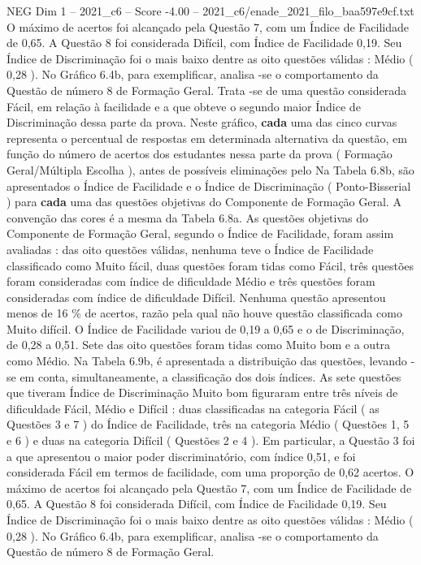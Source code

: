 \begin{textsample}{NEG Dim 1 – 2021\_c6 – Score -4.00 – 2021\_c6/enade\_2021\_filo\_baa597e9cf.txt}
O máximo de acertos foi alcançado pela Questão 7, com um Índice de Facilidade de 0,65.
A Questão 8 foi considerada Difícil, com Índice de Facilidade 0,19.
Seu Índice de Discriminação foi o mais baixo dentre as oito questões válidas : Médio ( 0,28 ).
No Gráfico 6.4b, para exemplificar, analisa -se o comportamento da Questão de número 8 de Formação Geral.
Trata -se de uma questão considerada Fácil, em relação à facilidade e a que obteve o segundo maior Índice de Discriminação dessa parte da prova.
Neste gráfico, \textbf{cada} uma das cinco curvas representa o percentual de respostas em determinada alternativa da questão, em função do número de acertos dos estudantes nessa parte da prova ( Formação Geral/Múltipla Escolha ), antes de possíveis eliminações pelo Na Tabela 6.8b, são apresentados o Índice de Facilidade e o Índice de Discriminação ( Ponto-Bisserial ) para \textbf{cada} uma das questões objetivas do Componente de Formação Geral.
A convenção das cores é a mesma da Tabela 6.8a.
As questões objetivas do Componente de Formação Geral, segundo o Índice de Facilidade, foram assim avaliadas : das oito questões válidas, nenhuma teve o Índice de Facilidade classificado como Muito fácil, duas questões foram tidas como Fácil, três questões foram consideradas com índice de dificuldade Médio e três questões foram consideradas com índice de dificuldade Difícil.
Nenhuma questão apresentou menos de 16 \% de acertos, razão pela qual não houve questão classificada como Muito difícil.
O Índice de Facilidade variou de 0,19 a 0,65 e o de Discriminação, de 0,28 a 0,51.
Sete das oito questões foram tidas como Muito bom e a outra como Médio.
Na Tabela 6.9b, é apresentada a distribuição das questões, levando -se em conta, simultaneamente, a classificação dos dois índices.
As sete questões que tiveram Índice de Discriminação Muito bom figuraram entre três níveis de dificuldade Fácil, Médio e Difícil : duas classificadas na categoria Fácil ( as Questões 3 e 7 ) do Índice de Facilidade, três na categoria Médio ( Questões 1, 5 e 6 ) e duas na categoria Difícil ( Questões 2 e 4 ).
Em particular, a Questão 3 foi a que apresentou o maior poder discriminatório, com índice 0,51, e foi considerada Fácil em termos de facilidade, com uma proporção de 0,62 acertos.
O máximo de acertos foi alcançado pela Questão 7, com um Índice de Facilidade de 0,65.
A Questão 8 foi considerada Difícil, com Índice de Facilidade 0,19.
Seu Índice de Discriminação foi o mais baixo dentre as oito questões válidas : Médio ( 0,28 ).
No Gráfico 6.4b, para exemplificar, analisa -se o comportamento da Questão de número 8 de Formação Geral.

\end{textsample}
